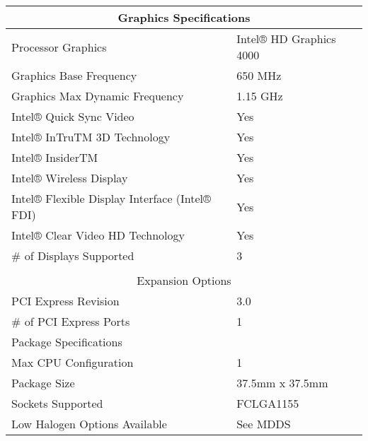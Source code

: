 \begin{table}[H]
  \begin{tabular}{ll}
  \hline
  \multicolumn{2}{|c|}{Graphics Specifications} \\ \hline
  \multicolumn{1}{|l|}{Processor Graphics} & \multicolumn{1}{l|}{Intel® HD Graphics 4000} \\ \hline
  \multicolumn{1}{|l|}{Graphics Base Frequency} & \multicolumn{1}{l|}{650 MHz} \\ \hline
  \multicolumn{1}{|l|}{Graphics Max Dynamic Frequency} & \multicolumn{1}{l|}{1.15 GHz} \\ \hline
  \multicolumn{1}{|l|}{Intel® Quick Sync Video} & \multicolumn{1}{l|}{Yes} \\ \hline
  \multicolumn{1}{|l|}{Intel® InTruTM 3D Technology} & \multicolumn{1}{l|}{Yes} \\ \hline
  \multicolumn{1}{|l|}{Intel® InsiderTM} & \multicolumn{1}{l|}{Yes} \\ \hline
  \multicolumn{1}{|l|}{Intel® Wireless Display} & \multicolumn{1}{l|}{Yes} \\ \hline
  \multicolumn{1}{|l|}{Intel® Flexible Display Interface (Intel® FDI)} & \multicolumn{1}{l|}{Yes} \\ \hline
  \multicolumn{1}{|l|}{Intel® Clear Video HD Technology} & \multicolumn{1}{l|}{Yes} \\ \hline
  \multicolumn{1}{|l|}{\# of Displays Supported} & \multicolumn{1}{l|}{3} \\ \hline
   &  \\ \hline
  \multicolumn{2}{|c|}{Expansion Options} \\ \hline
  \multicolumn{1}{|l|}{PCI Express Revision} & \multicolumn{1}{l|}{3.0} \\ \hline
  \multicolumn{1}{|l|}{\# of PCI Express Ports} & \multicolumn{1}{l|}{1} \\ \hline
  \multicolumn{1}{|l|}{Package Specifications} & \multicolumn{1}{l|}{} \\ \hline
  \multicolumn{1}{|l|}{Max CPU Configuration} & \multicolumn{1}{l|}{1} \\ \hline
  \multicolumn{1}{|l|}{Package Size} & \multicolumn{1}{l|}{37.5mm x 37.5mm} \\ \hline
  \multicolumn{1}{|l|}{Sockets Supported} & \multicolumn{1}{l|}{FCLGA1155} \\ \hline
  \multicolumn{1}{|l|}{Low Halogen Options Available} & \multicolumn{1}{l|}{See MDDS} \\ \hline
  \end{tabular}
\end{table}

